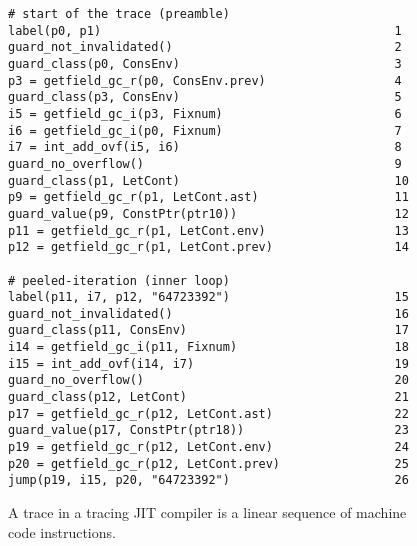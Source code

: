 \begin{figure}[!h]                    %
  \centering
  \begin{minipage}{0.7\textwidth}
    \begin{lstlisting}[style=rptrace-style]
# start of the trace (preamble)
label(p0, p1)                                         1
guard_not_invalidated()                               2
guard_class(p0, ConsEnv)                              3
p3 = getfield_gc_r(p0, ConsEnv.prev)                  4
guard_class(p3, ConsEnv)                              5
i5 = getfield_gc_i(p3, Fixnum)                        6
i6 = getfield_gc_i(p0, Fixnum)                        7
i7 = int_add_ovf(i5, i6)                              8
guard_no_overflow()                                   9
guard_class(p1, LetCont)                              10
p9 = getfield_gc_r(p1, LetCont.ast)                   11
guard_value(p9, ConstPtr(ptr10))                      12
p11 = getfield_gc_r(p1, LetCont.env)                  13
p12 = getfield_gc_r(p1, LetCont.prev)                 14

# peeled-iteration (inner loop)
label(p11, i7, p12, "64723392")                       15
guard_not_invalidated()                               16
guard_class(p11, ConsEnv)                             17
i14 = getfield_gc_i(p11, Fixnum)                      18
i15 = int_add_ovf(i14, i7)                            19
guard_no_overflow()                                   20
guard_class(p12, LetCont)                             21
p17 = getfield_gc_r(p12, LetCont.ast)                 22
guard_value(p17, ConstPtr(ptr18))                     23
p19 = getfield_gc_r(p12, LetCont.env)                 24
p20 = getfield_gc_r(p12, LetCont.prev)                25
jump(p19, i15, p20, "64723392")                       26
\end{lstlisting}
  \end{minipage}
  \caption{A trace in a tracing JIT compiler is a linear sequence of machine code instructions.}
  \label{fig:trace}
\end{figure}
